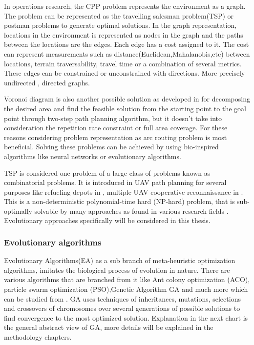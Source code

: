 
In operations research, the CPP problem represents the environment as a graph. The problem can be represented as the travelling salesman problem(TSP) or postman problems to generate optimal solutions. In the graph representation, locations in the environment is represented as nodes in the graph and the paths between the locations are the edges. Each edge has a cost assigned to it. The cost can represent measurements such as distance(Euclidean,Mahalanobis,etc) between locations, terrain traversability, travel time or a combination of several metrics. These edges can be constrained or unconstrained with directions. More precisely undirected , directed graphs.

Voronoi diagram is also another possible solution as developed in \cite{voronoi_UAV} for decomposing the desired area and find the feasible solution from the starting point to the goal point through two-step path planning algorithm, but it doesn't take into consideration the repetition rate constraint or full area coverage. For these reasons considering problem representation as arc routing problem is most beneficial. Solving these problems can be achieved by using bio-inspired algorithms like neural networks or evolutionary algorithms.

TSP is considered one problem of a large class of problems known as combinatorial problems. It is introduced in UAV path planning for several purposes like refueling depots in \cite{TSP_UAV}, multiple UAV cooperative reconnaissance in \cite{TSP_UAV_Multi}. This is a non-deterministic polynomial-time hard (NP-hard) problem, that is sub-optimally solvable by many approaches as found in various research fields \cite{TSP_NPHARD}. Evolutionary approaches specifically will be considered in this thesis.  

\subsubsection*{Evolutionary algorithms}


Evolutionary Algorithms(EA) as a sub branch of meta-heuristic optimization algorithms, imitates the biological process of evolution in nature. There are various algorithms that are branched from it like Ant colony optimization (ACO), particle swarm optimization (PSO),Genetic Algorithm GA and much more which can be studied from \cite{Evo_Book1,Evo_Book2}. GA uses techniques of inheritances, mutations, selections and crossovers of chromosomes over several generations of possible solutions to find convergence to the most optimized solution. Explanation in the next chart is the general abstract view of GA, more details will be explained in the methodology chapters.

